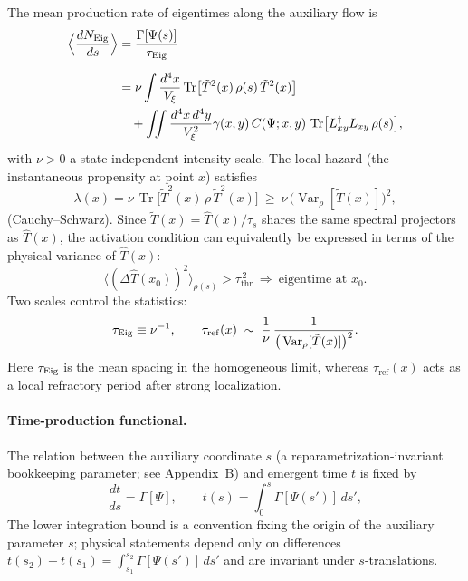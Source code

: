 \documentclass[12pt,a4paper]{article}
\newcommand{\Var}{\operatorname{Var}}
\renewcommand{\Tr}{\operatorname{Tr}}
\newcommand{\Vxi}{V_\xi}          %
\newcommand{\intx}{\int \frac{d^4x}{\Vxi}}
\newcommand{\intxy}{\iint \frac{d^4x\,d^4y}{\Vxi^2}}
\numberwithin{equation}{section}
\begin{document}
\noindent The mean production rate of eigentimes along the auxiliary flow is
\begin{equation}
\begin{split}
\Big\langle\frac{dN_{\mathrm{Eig}}}{ds}\Big\rangle
&= \frac{\Gamma[\Psi(s)]}{\tau_{\rm Eig}} \\[6pt]
&= \nu \intx \Tr\!\big[\tilde{T}^2(x)\,\rho(s)\,\tilde{T}^2(x)\big] \\
&\quad + \intxy \gamma(x,y)\,C(\Psi;x,y)\,\Tr\!\big[L_{xy}^\dagger L_{xy}\,\rho(s)\big],
\end{split}
\label{eq:eigrate}
\end{equation}
with $\nu>0$ a state-independent intensity scale. The local hazard (the instantaneous propensity at point $x$) satisfies
\begin{equation}
\lambda(x)=\nu\,\Tr\!\big[\tilde{T}^2(x)\,\rho\,\tilde{T}^2(x)\big]
\ \ge\ \nu\,\big(\Var_\rho[\tilde{T}(x)]\big)^2,
\label{eq:local-hazard}
\end{equation}
(Cauchy--Schwarz). Since $\tilde{T}(x)=\hat{T}(x)/\tau_s$ shares the same
spectral projectors as $\hat{T}(x)$, the activation condition can equivalently be
expressed in terms of the physical variance of $\hat{T}(x)$:
\begin{equation}
\big\langle(\Delta\hat T(x_0))^2\big\rangle_{\rho(s)}>\tau_{\mathrm{thr}}^{\,2}
\ \Longrightarrow\ \text{eigentime at }x_0.
\label{eq:locthreshold}
\end{equation}
Two scales control the statistics:
\begin{equation}
\tau_{\rm Eig} \equiv \nu^{-1},\qquad
\tau_{\mathrm{ref}}(x)\;\sim\;\frac{1}{\nu}\,
\frac{1}{\big(\Var_{\rho}[\tilde{T}(x)]\big)^{2}}.
\label{eq:eigscale}
\end{equation}
Here $\tau_{\rm Eig}$ is the mean spacing in the homogeneous limit, whereas $\tau_{\mathrm{ref}}(x)$ acts as a local refractory period after strong localization.

\paragraph{Time-production functional.}
The relation between the auxiliary coordinate $s$ (a reparametrization-invariant bookkeeping parameter; see Appendix~B) and emergent time $t$ is fixed by
\begin{equation}
\frac{dt}{ds} = \Gamma[\Psi], \qquad
t(s) = \int_0^s \Gamma[\Psi(s')]\, ds',
\label{eq:s-to-t-bootstrap}
\end{equation}
\noindent The lower integration bound is a convention fixing the origin of the auxiliary
parameter $s$; physical statements depend only on differences
$t(s_2)-t(s_1)=\int_{s_1}^{s_2}\Gamma[\Psi(s')]\,ds'$ and are invariant under $s$-translations.
\end{document}

